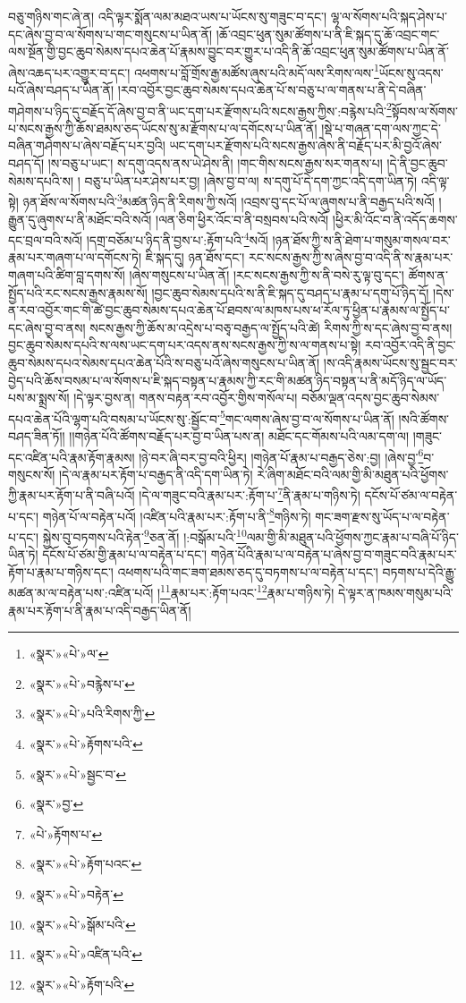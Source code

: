 བཅུ་གཉིས་གང་ཞེ་ན། འདི་ལྟར་སྨོན་ལམ་མཐའ་ཡས་པ་ཡོངས་སུ་གཟུང་བ་དང་། ལྷ་ལ་སོགས་པའི་སྐད་ཤེས་པ་དང་ཞེས་བྱ་བ་ལ་སོགས་པ་གང་གསུངས་པ་ཡིན་ནོ། །ཆོ་འབྲང་ཕུན་སུམ་ཚོགས་པ་ནི་ཇི་སྐད་དུ་ཆོ་འབྲང་གང་ལས་སྔོན་གྱི་བྱང་ཆུབ་སེམས་དཔའ་ཆེན་པོ་རྣམས་བྱུང་བར་གྱུར་པ་འདི་ནི་ཆོ་འབྲང་ཕུན་སུམ་ཚོགས་པ་ཡིན་ནོ་ཞེས་འཆད་པར་འགྱུར་བ་དང་། འཕགས་པ་བློ་གྲོས་རྒྱ་མཚོས་ཞུས་པའི་མདོ་ལས་རིགས་ལས་\footnote{«སྣར་»«པེ་»ལ་}ཡོངས་སུ་འདས་པའོ་ཞེས་བཤད་པ་ཡིན་ནོ། །རབ་འབྱོར་བྱང་ཆུབ་སེམས་དཔའ་ཆེན་པོ་ས་བཅུ་པ་ལ་གནས་པ་ནི་དེ་བཞིན་གཤེགས་པ་ཉིད་དུ་བརྗོད་དོ་ཞེས་བྱ་བ་ནི་ཡང་དག་པར་རྫོགས་པའི་སངས་རྒྱས་ཀྱིས་:བརྙེས་པའི་\footnote{«སྣར་»«པེ་»བརྙེས་པ་}སྟོབས་ལ་སོགས་པ་སངས་རྒྱས་ཀྱི་ཆོས་ཐམས་ཅད་ཡོངས་སུ་མ་རྫོགས་པ་ལ་དགོངས་པ་ཡིན་ནོ། །སྡེ་པ་གཞན་དག་ལས་ཀྱང་དེ་བཞིན་གཤེགས་པ་ཞེས་བརྗོད་པར་བྱའི། ཡང་དག་པར་རྫོགས་པའི་སངས་རྒྱས་ཞེས་ནི་བརྗོད་པར་མི་བྱའོ་ཞེས་བཤད་དོ། །ས་བཅུ་པ་ཡང་། ས་དགུ་འདས་ནས་ཡེ་ཤེས་ནི། །གང་གིས་སངས་རྒྱས་སར་གནས་པ། །དེ་ནི་བྱང་ཆུབ་སེམས་དཔའི་ས། །
བཅུ་པ་ཡིན་པར་ཤེས་པར་བྱ། །ཞེས་བྱ་བ་ལ། ས་དགུ་པོ་དེ་དག་ཀྱང་འདི་དག་ཡིན་ཏེ། འདི་ལྟ་སྟེ། ཉན་ཐོས་ལ་སོགས་པའི་\footnote{«སྣར་»«པེ་»པའི་རིགས་ཀྱི་}མཚན་ཉིད་ནི་རིགས་ཀྱི་སའོ། །འབྲས་བུ་དང་པོ་ལ་ཞུགས་པ་ནི་བརྒྱད་པའི་སའོ། །རྒྱུན་དུ་ཞུགས་པ་ནི་མཐོང་བའི་སའོ། །ལན་ཅིག་ཕྱིར་འོང་བ་ནི་བསྲབས་པའི་སའོ། །ཕྱིར་མི་འོང་བ་ནི་འདོད་ཆགས་དང་བྲལ་བའི་སའོ། །དགྲ་བཅོམ་པ་ཉིད་ནི་བྱས་པ་:རྟོག་པའི་\footnote{«སྣར་»«པེ་»རྟོགས་པའི་}སའོ། །ཉན་ཐོས་ཀྱི་ས་ནི་ཐེག་པ་གསུམ་གསལ་བར་རྣམ་པར་གཞག་པ་ལ་དགོངས་ཏེ། ཇི་སྐད་དུ། ཉན་ཐོས་དང་། རང་སངས་རྒྱས་ཀྱི་ས་ཞེས་བྱ་བ་འདི་ནི་ས་རྣམ་པར་གཞག་པའི་ཚིག་བླ་དགས་སོ། །ཞེས་གསུངས་པ་ཡིན་ནོ། །རང་སངས་རྒྱས་ཀྱི་ས་ནི་བསེ་རུ་ལྟ་བུ་དང་། ཚོགས་ན་སྤྱོད་པའི་རང་སངས་རྒྱས་རྣམས་སོ། །བྱང་ཆུབ་སེམས་དཔའི་ས་ནི་ཇི་སྐད་དུ་བཤད་པ་རྣམ་པ་དགུ་པོ་ཉིད་དོ། །དེས་ན་རབ་འབྱོར་གང་གི་ཚེ་བྱང་ཆུབ་སེམས་དཔའ་ཆེན་པོ་ཐབས་ལ་མཁས་པས་ཕ་རོལ་ཏུ་ཕྱིན་པ་རྣམས་ལ་སྤྱོད་པ་དང་ཞེས་བྱ་བ་ནས། སངས་རྒྱས་ཀྱི་ཆོས་མ་འདྲེས་པ་བཅྭ་བརྒྱད་ལ་སྤྱོད་པའི་ཚེ། རིགས་ཀྱི་ས་དང་ཞེས་བྱ་བ་ནས། བྱང་ཆུབ་སེམས་དཔའི་ས་ལས་ཡང་དག་པར་འདས་ནས་སངས་རྒྱས་ཀྱི་ས་ལ་གནས་པ་སྟེ། རབ་འབྱོར་འདི་ནི་བྱང་ཆུབ་སེམས་དཔའ་སེམས་དཔའ་ཆེན་པོའི་ས་བཅུ་པའོ་ཞེས་གསུངས་པ་ཡིན་ནོ། །ས་འདི་རྣམས་ཡོངས་སུ་སྦྱང་བར་བྱེད་པའི་ཆོས་བསམ་པ་ལ་སོགས་པ་ཇི་སྐད་བསྟན་པ་རྣམས་ཀྱི་རང་གི་མཚན་ཉིད་བསྟན་པ་ནི་མདོ་ཉིད་ལ་ཡོད་པས་མ་སྨྲས་སོ། །དེ་ལྟར་བྱས་ན། གནས་བརྟན་རབ་འབྱོར་གྱིས་གསོལ་པ། བཅོམ་ལྡན་འདས་བྱང་ཆུབ་སེམས་དཔའ་ཆེན་པོའི་ལྷག་པའི་བསམ་པ་ཡོངས་སུ་:སྦྱོང་བ་\footnote{«སྣར་»«པེ་»སྦྱང་བ་}གང་ལགས་ཞེས་བྱ་བ་ལ་སོགས་པ་ཡིན་ནོ། །སའི་ཚོགས་བཤད་ཟིན་ཏོ།། །།གཉེན་པོའི་ཚོགས་བརྗོད་པར་བྱ་བ་ཡིན་པས་ན། མཐོང་དང་གོམས་པའི་ལམ་དག་ལ། །གཟུང་དང་འཛིན་པའི་རྣམ་རྟོག་རྣམས། །ཉེ་བར་ཞི་བར་བྱ་བའི་ཕྱིར། །གཉེན་པོ་རྣམ་པ་བརྒྱད་ཅེས་:བྱ། །ཞེས་བྱ་\footnote{«སྣར་»བྱ་}བ་གསུངས་སོ། །དེ་ལ་རྣམ་པར་རྟོག་པ་བརྒྱད་ནི་འདི་དག་ཡིན་ཏེ། རེ་ཞིག་མཐོང་བའི་ལམ་གྱི་མི་མཐུན་པའི་ཕྱོགས་ཀྱི་རྣམ་པར་རྟོག་པ་ནི་བཞི་པའོ། །དེ་ལ་གཟུང་བའི་རྣམ་པར་:རྟོག་པ་\footnote{«པེ་»རྟོགས་པ་}ནི་རྣམ་པ་གཉིས་ཏེ། དངོས་པོ་ཙམ་ལ་བརྟེན་པ་དང་། གཉེན་པོ་ལ་བརྟེན་པའོ། །འཛིན་པའི་རྣམ་པར་:རྟོག་པ་ནི་\footnote{«སྣར་»«པེ་»རྟོག་པའང་}གཉིས་ཏེ། གང་ཟག་རྫས་སུ་ཡོད་པ་ལ་བརྟེན་པ་དང་། སྐྱེས་བུ་བཏགས་པའི་རྟེན་\footnote{«སྣར་»«པེ་»བརྟེན་}ཅན་ནོ། །:བསྒོམ་པའི་\footnote{«སྣར་»«པེ་»སྒོམ་པའི་}ལམ་གྱི་མི་མཐུན་པའི་ཕྱོགས་ཀྱང་རྣམ་པ་བཞི་པོ་ཉིད་ཡིན་ཏེ། དངོས་པོ་ཙམ་གྱི་རྣམ་པ་ལ་བརྟེན་པ་དང་། གཉེན་པོའི་རྣམ་པ་ལ་བརྟེན་པ་ཞེས་བྱ་བ་གཟུང་བའི་རྣམ་པར་རྟོག་པ་རྣམ་པ་གཉིས་དང་། འཕགས་པའི་གང་ཟག་ཐམས་ཅད་དུ་བཏགས་པ་ལ་བརྟེན་པ་དང་། བཏགས་པ་དེའི་རྒྱུ་མཚན་མ་ལ་བརྟེན་པས་:འཛིན་པའོ། །\footnote{«སྣར་»«པེ་»འཛིན་པའི་}རྣམ་པར་:རྟོག་པའང་\footnote{«སྣར་»«པེ་»རྟོག་པའི་}རྣམ་པ་གཉིས་ཏེ། དེ་ལྟར་ན་ཁམས་གསུམ་པའི་རྣམ་པར་རྟོག་པ་ནི་རྣམ་པ་འདི་བརྒྱད་ཡིན་ནོ། 